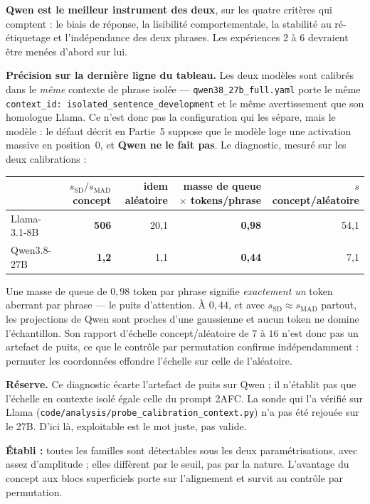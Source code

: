 \documentclass[a4paper,10pt]{article}
\begin{document}
\textbf{Qwen est le meilleur instrument des deux}, sur les quatre critères qui comptent : le biais de
réponse, la lisibilité comportementale, la stabilité au ré-étiquetage et l'indépendance des deux
phrases. Les expériences 2 à 6 devraient être menées d'abord sur lui.

\textbf{Précision sur la dernière ligne du tableau.} Les deux modèles sont calibrés dans le
\emph{même} contexte de phrase isolée --- \texttt{qwen38\_27b\_full.yaml} porte le même
\texttt{context\_id: isolated\_sentence\_development} et le même avertissement que son homologue
Llama. Ce n'est donc pas la configuration qui les sépare, mais le modèle : le défaut décrit en
Partie~5 suppose que le modèle loge une activation massive en position~0, et \textbf{Qwen ne le fait
pas}. Le diagnostic, mesuré sur les deux calibrations :

\begin{center}\small
\begin{tabular}{lrrrr}
\toprule
& $s_{\mathrm{SD}}/s_{\mathrm{MAD}}$ concept & idem aléatoire & masse de queue $\times$ tokens/phrase & $s$ concept/aléatoire \\
\midrule
Llama-3.1-8B & \textbf{506} & 20,1 & \textbf{0,98} & 54,1 \\
Qwen3.8-27B  & \textbf{1,2} & 1,1  & \textbf{0,44} & 7,1 \\
\bottomrule
\end{tabular}
\end{center}

Une masse de queue de $0{,}98$ token par phrase signifie \emph{exactement un} token aberrant par
phrase --- le puits d'attention. À $0{,}44$, et avec $s_{\mathrm{SD}} \approx s_{\mathrm{MAD}}$
partout, les projections de Qwen sont proches d'une gaussienne et aucun token ne domine
l'échantillon. Son rapport d'échelle concept/aléatoire de $7$ à $16$ n'est donc pas un artefact de
puits, ce que le contrôle par permutation confirme indépendamment : permuter les coordonnées
effondre l'échelle sur celle de l'aléatoire.

\textbf{Réserve.} Ce diagnostic écarte l'artefact de puits sur Qwen ; il n'établit pas que l'échelle
en contexte isolé égale celle du prompt 2AFC. La sonde qui l'a vérifié sur Llama
(\texttt{code/analysis/probe\_calibration\_context.py}) n'a pas été rejouée sur le 27B. D'ici là,
\og exploitable\fg{} est le mot juste, pas \og valide\fg{}.

\textbf{Établi :} toutes les familles sont détectables sous les deux paramétrisations, avec assez
d'amplitude ; elles diffèrent par le seuil, pas par la nature. L'avantage du concept aux blocs
superficiels porte sur l'alignement et survit au contrôle par permutation.
\end{document}
